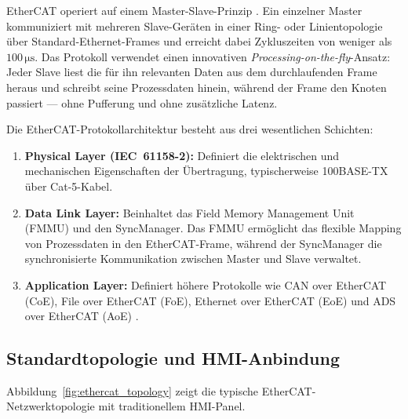 ﻿\documentclass[12pt,a4paper]{article}
\begin{document}
EtherCAT operiert auf einem Master-Slave-Prinzip \cite{etg_spec}. Ein einzelner Master
kommuniziert mit mehreren Slave-Geräten in einer Ring- oder Linientopologie über
Standard-Ethernet-Frames und erreicht dabei Zykluszeiten von weniger als
$100\,\si{\micro\second}$. Das Protokoll verwendet einen innovativen
\emph{Processing-on-the-fly}-Ansatz: Jeder Slave liest die für ihn relevanten Daten aus
dem durchlaufenden Frame heraus und schreibt seine Prozessdaten hinein, während der
Frame den Knoten passiert --- ohne Pufferung und ohne zusätzliche Latenz.

Die EtherCAT-Protokollarchitektur besteht aus drei wesentlichen Schichten:

\begin{enumerate}[leftmargin=2em]
  \item \textbf{Physical Layer (IEC~61158-2):} Definiert die elektrischen und mechanischen
    Eigenschaften der Übertragung, typischerweise 100BASE-TX über Cat-5-Kabel.
  \item \textbf{Data Link Layer:} Beinhaltet das Field Memory Management Unit (FMMU) und
    den SyncManager. Das FMMU ermöglicht das flexible Mapping von Prozessdaten in den
    EtherCAT-Frame, während der SyncManager die synchronisierte Kommunikation zwischen
    Master und Slave verwaltet.
  \item \textbf{Application Layer:} Definiert höhere Protokolle wie CAN over EtherCAT
    (CoE), File over EtherCAT (FoE), Ethernet over EtherCAT (EoE) und ADS over EtherCAT
    (AoE) \cite{iec61784}.
\end{enumerate}

\subsection{Standardtopologie und HMI-Anbindung}

Abbildung~\ref{fig:ethercat_topology} zeigt die typische EtherCAT-Netzwerktopologie mit
traditionellem HMI-Panel.
\end{document}
